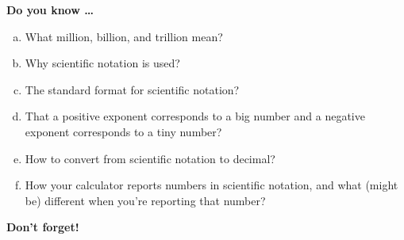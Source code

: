 \newpage %



\bigskip

\noindent \textbf{Do you know \ldots}

\begin{enumerate} [(a)]
\item What million, billion, and trillion mean? \vfill
\item Why scientific notation is used? \vfill 
\item The standard format for scientific notation? \vfill 
\item That a positive exponent corresponds to a big number and a negative exponent corresponds to a tiny number? \vfill
\item How to convert from scientific notation to decimal? \vfill
\item How your calculator reports numbers in scientific notation, and what (might be) different when you're reporting that number? \vfill
\end{enumerate}

\noindent \textbf{Don't forget!}
\vfill \vfill \vfill




